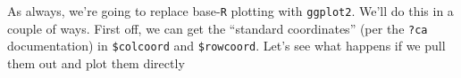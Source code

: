\documentclass[
]{book}
\newenvironment{Shaded}{\begin{snugshade}}{\end{snugshade}}
\newcommand{\AttributeTok}[1]{\textcolor[rgb]{0.13,0.29,0.53}{#1}}
\newcommand{\FunctionTok}[1]{\textcolor[rgb]{0.13,0.29,0.53}{\textbf{#1}}}
\newcommand{\NormalTok}[1]{#1}
\newcommand{\OtherTok}[1]{\textcolor[rgb]{0.56,0.35,0.01}{#1}}
\newcommand{\SpecialCharTok}[1]{\textcolor[rgb]{0.81,0.36,0.00}{\textbf{#1}}}
\newcommand{\StringTok}[1]{\textcolor[rgb]{0.31,0.60,0.02}{#1}}
\begin{document}
As always, we're going to replace base-\texttt{R} plotting with \texttt{ggplot2}. We'll do this in a couple of ways. First off, we can get the ``standard coordinates'' (per the \texttt{?ca} documentation) in \texttt{\$colcoord} and \texttt{\$rowcoord}. Let's see what happens if we pull them out and plot them directly

\begin{Shaded}
\end{Shaded}
\end{document}
